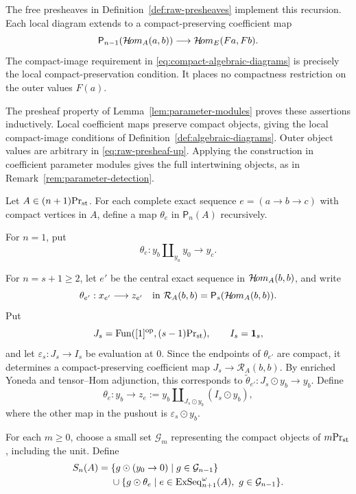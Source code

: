 The free presheaves in Definition~\ref{def:raw-presheaves} implement
this recursion. Each local diagram extends to a compact-preserving
coefficient map
\[
 \mathsf P_{n-1}(\mathcal{H}\!om_A(a,b))
       \longrightarrow\mathcal{H}\!om_E(Fa,Fb).
\]
The compact-image requirement in \eqref{eq:compact-algebraic-diagrams}
is precisely the local compact-preservation condition. It places no
compactness restriction on the outer values $F(a)$.



The presheaf property of Lemma~\ref{lem:parameter-modules} proves
these assertions inductively. Local coefficient maps preserve compact
objects, giving the local compact-image conditions of
Definition~\ref{def:algebraic-diagrams}. Outer object values are
arbitrary in \eqref{eq:raw-presheaf-up}. Applying the construction in
coefficient parameter modules gives the full intertwining objects,
as in Remark~\ref{rem:parameter-detection}.


\begin{definition}\label{def:additive-relations}
Let $A\in{(n+1)}\mathrm{Pr}_{\mathrm{st}}$. For each complete exact
sequence $e=(a\to b\to c)$ with compact vertices
in $A$, define a map $\theta_e$ in $\mathsf P_n(A)$
recursively.

For $n=1$, put
\[
 \theta_e:
 y_b\amalg_{y_a}y_0\longrightarrow y_c.
\]

For $n=s+1\geq2$, let $e'$ be the central exact
sequence in $\mathcal{H}\!om_A(b,b)$, and write
\[
 \theta_{e'}:x_{e'}\longrightarrow z_{e'}
 \quad\text{in }\mathcal R_A(b,b)
 =\mathsf P_s(\mathcal{H}\!om_A(b,b)).
\]
Put
\[
 J_s=\operatorname{Fun}([1]^{\mathrm{op}},{(s-1)}\mathrm{Pr}_{\mathrm{st}}),
 \qquad I_s=\mathbf 1_s,
\]
and let $\varepsilon_s:J_s\to I_s$ be evaluation
at $0$. Since the endpoints of $\theta_{e'}$
are compact, it determines a compact-preserving
coefficient map
\(
 J_s\longrightarrow\mathcal R_A(b,b)\).
By enriched Yoneda and tensor--Hom adjunction,
this corresponds to
\(
 \widetilde\theta_{e'}:
 J_s\odot y_b\longrightarrow y_b\).
Define
\[
 \theta_e:y_b\longrightarrow
 z_e:=y_b\amalg_{J_s\odot y_b}(I_s\odot y_b),
\]
where the other map in the pushout is
$\varepsilon_s\odot y_b$.

For each $m\geq0$, choose a small set
$\mathcal G_m$ representing the compact objects
of ${m}\mathrm{Pr}_{\mathrm{st}}$, including the unit. Define
\begin{equation}\label{eq:additive-relation-set}
\begin{split}
 S_n(A)={}&
 \{g\odot(y_0\to0)\mid g\in\mathcal G_{n-1}\}\\
 &{}\cup
 \{g\odot\theta_e\mid
 e\in\operatorname{ExSeq}_{n+1}^\omega(A),\
 g\in\mathcal G_{n-1}\}.
\end{split}
\end{equation}
\end{definition}

